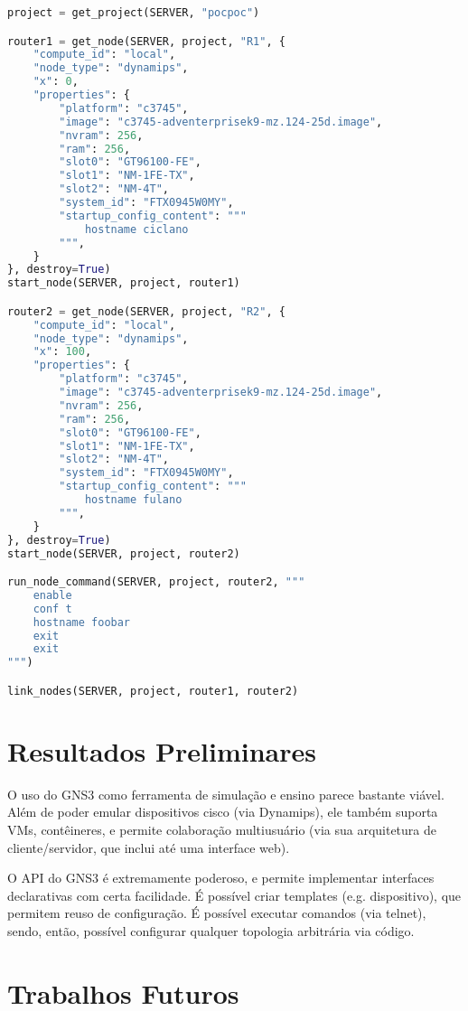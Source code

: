 \documentclass[12pt]{article}
\begin{document}
\begin{lstlisting}[language=Python]
project = get_project(SERVER, "pocpoc")

router1 = get_node(SERVER, project, "R1", {
    "compute_id": "local",
    "node_type": "dynamips",
    "x": 0,
    "properties": {
        "platform": "c3745",
        "image": "c3745-adventerprisek9-mz.124-25d.image",
        "nvram": 256,
        "ram": 256, 
        "slot0": "GT96100-FE",
        "slot1": "NM-1FE-TX",
        "slot2": "NM-4T",
        "system_id": "FTX0945W0MY",
        "startup_config_content": """
            hostname ciclano
        """,
    }
}, destroy=True)
start_node(SERVER, project, router1)

router2 = get_node(SERVER, project, "R2", {
    "compute_id": "local",
    "node_type": "dynamips",
    "x": 100,
    "properties": {
        "platform": "c3745",
        "image": "c3745-adventerprisek9-mz.124-25d.image",
        "nvram": 256,
        "ram": 256, 
        "slot0": "GT96100-FE",
        "slot1": "NM-1FE-TX",
        "slot2": "NM-4T",
        "system_id": "FTX0945W0MY",
        "startup_config_content": """
            hostname fulano
        """,
    }
}, destroy=True)
start_node(SERVER, project, router2)

run_node_command(SERVER, project, router2, """
    enable
    conf t
    hostname foobar
    exit
    exit
""")

link_nodes(SERVER, project, router1, router2)
\end{lstlisting}

\section{Resultados Preliminares}

O uso do GNS3 como ferramenta de simulação e ensino parece bastante viável.
Além de poder emular dispositivos cisco (via Dynamips), ele também suporta VMs,
contêineres, e permite colaboração multiusuário (via sua arquitetura de
cliente/servidor, que inclui até uma interface web).

O API do GNS3 é extremamente poderoso, e permite implementar interfaces
declarativas com certa facilidade. É possível criar templates (e.g.
dispositivo), que permitem reuso de configuração. É possível executar comandos
(via telnet), sendo, então, possível configurar qualquer topologia arbitrária
via código.

\section{Trabalhos Futuros}
\end{document}
